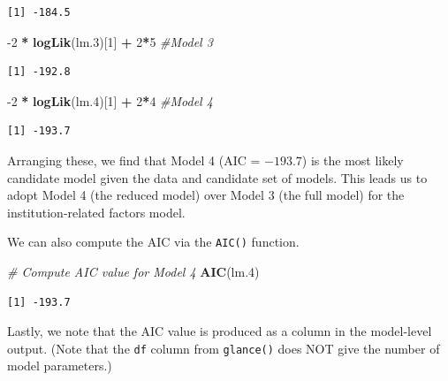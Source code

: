 \documentclass[]{book}
\newenvironment{Shaded}{\begin{snugshade}}{\end{snugshade}}
\newcommand{\CommentTok}[1]{\textcolor[rgb]{0.56,0.35,0.01}{\textit{#1}}}
\newcommand{\DecValTok}[1]{\textcolor[rgb]{0.00,0.00,0.81}{#1}}
\newcommand{\FloatTok}[1]{\textcolor[rgb]{0.00,0.00,0.81}{#1}}
\newcommand{\KeywordTok}[1]{\textcolor[rgb]{0.13,0.29,0.53}{\textbf{#1}}}
\newcommand{\NormalTok}[1]{#1}
\newcommand{\OperatorTok}[1]{\textcolor[rgb]{0.81,0.36,0.00}{\textbf{#1}}}
\newcommand{\StringTok}[1]{\textcolor[rgb]{0.31,0.60,0.02}{#1}}
\begin{document}
\begin{verbatim}
[1] -184.5
\end{verbatim}

\begin{Shaded}
\begin{Highlighting}[]
\DecValTok{-2} \OperatorTok{*}\StringTok{ }\KeywordTok{logLik}\NormalTok{(lm}\FloatTok{.3}\NormalTok{)[}\DecValTok{1}\NormalTok{] }\OperatorTok{+}\StringTok{ }\DecValTok{2}\OperatorTok{*}\DecValTok{5} \CommentTok{#Model 3}
\end{Highlighting}
\end{Shaded}

\begin{verbatim}
[1] -192.8
\end{verbatim}

\begin{Shaded}
\begin{Highlighting}[]
\DecValTok{-2} \OperatorTok{*}\StringTok{ }\KeywordTok{logLik}\NormalTok{(lm}\FloatTok{.4}\NormalTok{)[}\DecValTok{1}\NormalTok{] }\OperatorTok{+}\StringTok{ }\DecValTok{2}\OperatorTok{*}\DecValTok{4} \CommentTok{#Model 4}
\end{Highlighting}
\end{Shaded}

\begin{verbatim}
[1] -193.7
\end{verbatim}

Arranging these, we find that Model 4 (AIC = \(-193.7\)) is the most likely candidate model given the data and candidate set of models. This leads us to adopt Model 4 (the reduced model) over Model 3 (the full model) for the institution-related factors model.

We can also compute the AIC via the \texttt{AIC()} function.

\begin{Shaded}
\begin{Highlighting}[]
\CommentTok{# Compute AIC value for Model 4}
\KeywordTok{AIC}\NormalTok{(lm}\FloatTok{.4}\NormalTok{)}
\end{Highlighting}
\end{Shaded}

\begin{verbatim}
[1] -193.7
\end{verbatim}

Lastly, we note that the AIC value is produced as a column in the model-level output. (Note that the \texttt{df} column from \texttt{glance()} does NOT give the number of model parameters.)
\end{document}
